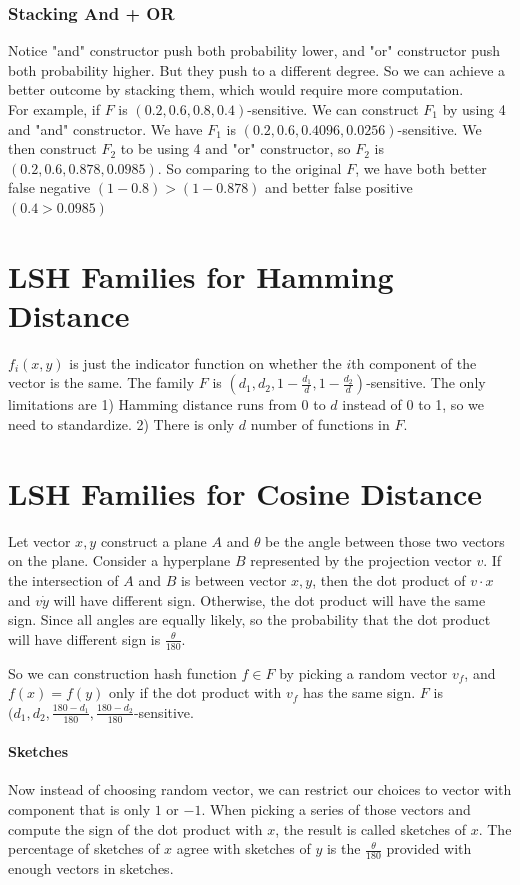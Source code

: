 \subsubsection{Stacking And + OR} 
Notice "and" constructor push both probability lower, and "or" constructor push both probability higher. But they push to a different degree. So we can achieve a better outcome by stacking them, which would require more computation. \\

For example, if $F$ is $(0.2, 0.6, 0.8, 0.4)$-sensitive. We can construct $F_1$ by using 4 and "and" constructor. We have $F_1$ is $(0.2, 0.6, 0.4096, 0.0256)$-sensitive. We then construct $F_2$ to be using 4 and "or" constructor, so $F_2$ is $(0.2, 0.6, 0.878, 0.0985)$. So comparing to the original $F$, we have both better false negative $(1-0.8) > (1 - 0.878)$ and better false positive $(0.4 > 0.0985)$

\section{LSH Families for Hamming Distance} 
$f_i(x,y)$ is just the indicator function on whether the $i$th component of the vector is the same. The family $F$ is $(d_1, d_2, 1 - \frac{d_1}{d}, 1 - \frac{d_2}{d})$-sensitive. The only limitations are 1) Hamming distance runs from $0$ to $d$ instead of 0 to 1, so we need to standardize. 2) There is only $d$ number of functions in $F$.  

\section{LSH Families for Cosine Distance} 
Let vector $x, y$ construct a plane $A$ and $\theta$ be the angle between those two vectors on the plane. Consider a hyperplane $B$ represented by the projection vector $v$. If the intersection of $A$ and $B$ is between vector $x,y$, then the dot product of $v \cdot x$ and $v \dot y$ will have different sign. Otherwise, the dot product will have the same sign. Since all angles are equally likely, so the probability that the dot product will have different sign is $\frac{\theta}{180}$. 

So we can construction hash function $f\in F$ by picking a random vector $v_f$, and $f(x) = f(y)$ only if the dot product with $v_f$ has the same sign. $F$ is $(d_1, d_2, \frac{180-d_1}{180}, \frac{180-d_2}{180}$-sensitive. 

\paragraph{Sketches} Now instead of choosing random vector, we can restrict our choices to vector with component that is only $1$ or $-1$. When picking a series of those vectors and compute the sign of the dot product with $x$, the result is called sketches of $x$.  The percentage of sketches of $x$ agree with sketches of $y$ is the $\frac{\theta}{180}$ provided with enough vectors in sketches. 

